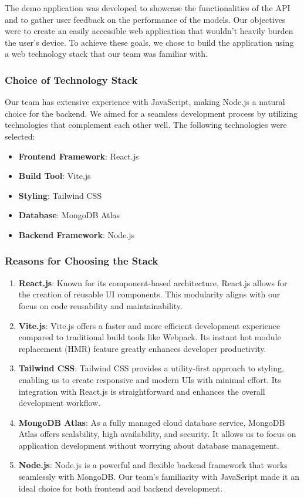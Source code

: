 The demo application was developed to showcase the functionalities of the API and to gather user feedback on the performance of the models. Our objectives were to create an easily accessible web application that wouldn't heavily burden the user's device. To achieve these goals, we chose to build the application using a web technology stack that our team was familiar with.

\subsubsection*{Choice of Technology Stack}

Our team has extensive experience with JavaScript, making Node.js a natural choice for the backend. We aimed for a seamless development process by utilizing technologies that complement each other well. The following technologies were selected:

\begin{itemize}
    \item \textbf{Frontend Framework}: React.js
    \item \textbf{Build Tool}: Vite.js
    \item \textbf{Styling}: Tailwind CSS
    \item \textbf{Database}: MongoDB Atlas
    \item \textbf{Backend Framework}: Node.js
\end{itemize}

\subsubsection*{Reasons for Choosing the Stack}

\begin{enumerate}
    \item \textbf{React.js}: Known for its component-based architecture, React.js allows for the creation of reusable UI components. This modularity aligns with our focus on code reusability and maintainability.
    \item \textbf{Vite.js}: Vite.js offers a faster and more efficient development experience compared to traditional build tools like Webpack. Its instant hot module replacement (HMR) feature greatly enhances developer productivity.
    \item \textbf{Tailwind CSS}: Tailwind CSS provides a utility-first approach to styling, enabling us to create responsive and modern UIs with minimal effort. Its integration with React.js is straightforward and enhances the overall development workflow.
    \item \textbf{MongoDB Atlas}: As a fully managed cloud database service, MongoDB Atlas offers scalability, high availability, and security. It allows us to focus on application development without worrying about database management.
    \item \textbf{Node.js}: Node.js is a powerful and flexible backend framework that works seamlessly with MongoDB. Our team's familiarity with JavaScript made it an ideal choice for both frontend and backend development.
\end{enumerate}

